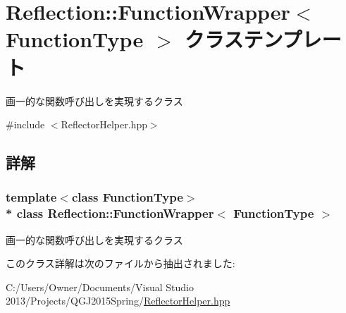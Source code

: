 \hypertarget{class_reflection_1_1_function_wrapper}{}\section{Reflection\+:\+:Function\+Wrapper$<$ Function\+Type $>$ クラステンプレート}
\label{class_reflection_1_1_function_wrapper}


画一的な関数呼び出しを実現するクラス 




{\ttfamily \#include $<$Reflector\+Helper.\+hpp$>$}



\subsection{詳解}
\subsubsection*{template$<$class Function\+Type$>$\\*
class Reflection\+::\+Function\+Wrapper$<$ Function\+Type $>$}

画一的な関数呼び出しを実現するクラス



このクラス詳解は次のファイルから抽出されました\+:\begin{DoxyCompactItemize}
\item 
C\+:/\+Users/\+Owner/\+Documents/\+Visual Studio 2013/\+Projects/\+Q\+G\+J2015\+Spring/\hyperlink{_reflector_helper_8hpp}{Reflector\+Helper.\+hpp}\end{DoxyCompactItemize}
